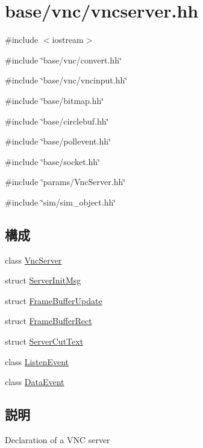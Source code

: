 \hypertarget{vncserver_8hh}{
\section{base/vnc/vncserver.hh}
\label{vncserver_8hh}
}
{\ttfamily \#include $<$iostream$>$}\par
{\ttfamily \#include \char`\"{}base/vnc/convert.hh\char`\"{}}\par
{\ttfamily \#include \char`\"{}base/vnc/vncinput.hh\char`\"{}}\par
{\ttfamily \#include \char`\"{}base/bitmap.hh\char`\"{}}\par
{\ttfamily \#include \char`\"{}base/circlebuf.hh\char`\"{}}\par
{\ttfamily \#include \char`\"{}base/pollevent.hh\char`\"{}}\par
{\ttfamily \#include \char`\"{}base/socket.hh\char`\"{}}\par
{\ttfamily \#include \char`\"{}params/VncServer.hh\char`\"{}}\par
{\ttfamily \#include \char`\"{}sim/sim\_\-object.hh\char`\"{}}\par
\subsection*{構成}
\begin{DoxyCompactItemize}
\item 
class \hyperlink{classVncServer}{VncServer}
\item 
struct \hyperlink{structVncServer_1_1ServerInitMsg}{ServerInitMsg}
\item 
struct \hyperlink{structVncServer_1_1FrameBufferUpdate}{FrameBufferUpdate}
\item 
struct \hyperlink{structVncServer_1_1FrameBufferRect}{FrameBufferRect}
\item 
struct \hyperlink{structVncServer_1_1ServerCutText}{ServerCutText}
\item 
class \hyperlink{classVncServer_1_1ListenEvent}{ListenEvent}
\item 
class \hyperlink{classVncServer_1_1DataEvent}{DataEvent}
\end{DoxyCompactItemize}


\subsection{説明}
Declaration of a VNC server 